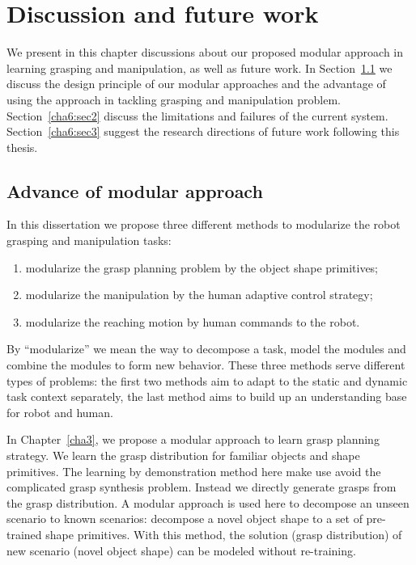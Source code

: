 \chapter{Discussion and future work}
\label{cha6}
We present in this chapter discussions about our proposed modular approach in learning grasping and manipulation, as well as future work. In Section~\ref{cha6:sec1} we discuss the design principle of our modular approaches and the advantage of using the approach in tackling grasping and manipulation problem.  Section~\ref{cha6:sec2} discuss the limitations and failures of the current system. Section~\ref{cha6:sec3} suggest the research directions of future work following this thesis.


\section{Advance of modular approach}
\label{cha6:sec1}
In this dissertation we propose three different methods to modularize the robot grasping and manipulation tasks:

\begin{enumerate}
\item modularize the grasp planning problem by the object shape primitives;
\item modularize the manipulation by the human adaptive control strategy;
\item modularize the reaching motion by human commands to the robot.
\end{enumerate}
By ``modularize'' we mean the way to decompose a task, model the modules and combine the modules to form new behavior. These three methods serve different types of problems: the first two methods aim to adapt to the static and dynamic task context separately, the last method aims to build up an understanding base for robot and human.

In Chapter~\ref{cha3}, we propose a modular approach to learn grasp planning strategy. We learn the grasp distribution for familiar objects and shape primitives. The learning by demonstration method here make use avoid the complicated grasp synthesis problem. Instead we directly generate grasps from the grasp distribution. A modular approach is used here to decompose an unseen scenario to known scenarios: decompose a novel object shape to a set of pre-trained shape primitives. With this method, the solution (grasp distribution) of new scenario (novel object shape) can be modeled without re-training.

